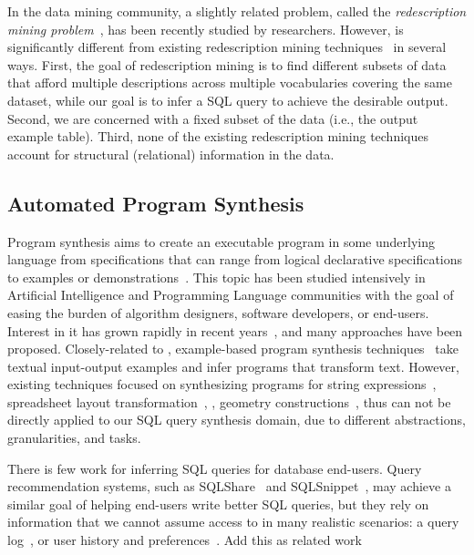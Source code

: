 In the data mining community, a slightly related problem,
called the \textit{redescription mining problem}~\cite{Ramakrishnan:2004},
has been recently studied by researchers.
However, \ourtool is significantly
different from existing redescription mining techniques~\cite{} in several ways.
First, the goal of redescription mining is to find different subsets of
data that afford multiple descriptions across multiple vocabularies
covering the same dataset, while our goal is to infer a SQL query 
to achieve the desirable output. 
Second, we are concerned with a fixed subset of the data (i.e., the output example table).
Third, none of the existing redescription mining techniques account for
structural (relational) information in the data. 


\subsection{Automated Program Synthesis }



Program synthesis aims to create an executable program
in some underlying language from specifications that can range
from logical declarative specifications to examples or
demonstrations~\cite{Harris:2011, singh:2012, Gulwani:2011}.
This topic has been studied intensively in Artificial Intelligence and
Programming Language communities with the goal of easing the burden of
algorithm designers, software developers, or end-users.
Interest in it has grown rapidly in recent years~\cite{Gulwani:2010:DPS},
and many approaches have been proposed.
Closely-related to \ourtool, example-based program synthesis
techniques~\cite{Kandel:2011, Fisher:2008,
Fisher08Pads,Lau:2003:PDU, Lau:2000:VSA, Barbosa:2010:MLA, Arasu:2009:LST}
take textual input-output examples and infer programs that transform text.
However, existing techniques focused on synthesizing programs for string
expressions~\cite{singh:2012, Gulwani:2011}, spreadsheet layout transformation~\cite{Harris:2011},
, geometry constructions~\cite{Gulwani:2011:SGC}, thus
can not be directly applied to our SQL query synthesis domain,
due to different abstractions, granularities, and tasks.

There is few work for inferring SQL queries for database end-users.
Query recommendation systems, such as SQLShare~\cite{} and SQLSnippet~\cite{},
may achieve a similar goal of helping end-users write better SQL
queries, but they rely on information
that we cannot assume access to in many realistic scenarios: a query log~\cite{Khoussainova:2010},
or user history and preferences~\cite{Howe:2011}.
Add this as related work~\cite{abs-1208-2013}

